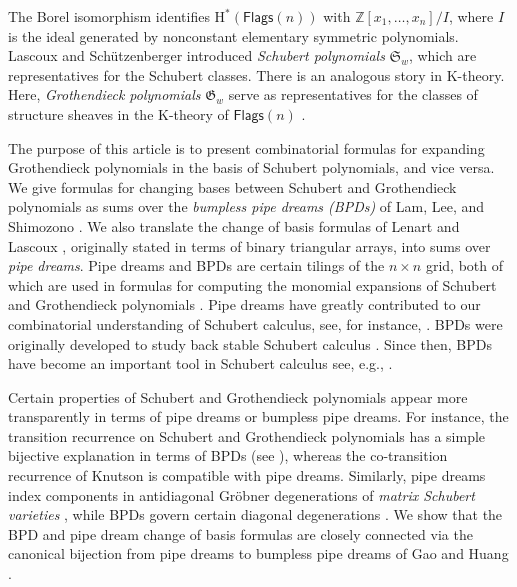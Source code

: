 \documentclass[12 pt]{amsart}
\newcommand{\Flags}{\mathsf{Flags}}
\numberwithin{equation}{section}
\theoremstyle{remark}
\begin{document}
	The Borel isomorphism identifies $\mathrm{H}^*(\Flags(n))$ with $\mathbb{Z}[x_1, \ldots, x_n]/I$, where $I$ is the ideal generated by nonconstant elementary symmetric polynomials. 
	Lascoux and Sch\"utzenberger \cite{Lascoux.Schutzenberger:Schubert} introduced \emph{Schubert polynomials} $\mathfrak{S}_w$, which are representatives for the Schubert classes. 
	There is an analogous story in K-theory. 
	Here, \emph{Grothendieck polynomials} $\mathfrak{G}_w$ serve as representatives for the classes of structure sheaves in the K-theory of $\Flags(n)$ \cite{Lascoux.Schutzenberger}. 
	
	The purpose of this article is to present combinatorial formulas for expanding Grothendieck polynomials in the basis of Schubert polynomials, and vice versa. We give formulas for changing bases between Schubert and Grothendieck polynomials as sums over the \emph{bumpless pipe dreams (BPDs)} of Lam, Lee, and Shimozono \cite{Lam.Lee.Shimozono}. We also translate the change of basis formulas of Lenart \cite{Lenart} and Lascoux \cite{Lascoux.03}, originally stated in terms of binary triangular arrays, into sums over \emph{pipe dreams}.
	Pipe dreams and BPDs are certain tilings of the $n \times n$ grid, both of which are used in formulas for computing the monomial expansions of Schubert and Grothendieck polynomials \cite{BJS93, Bergeron.Billey, Fomin.Stanley, Fomin.Kirillov, Fomin.Kirillov.96, Lam.Lee.Shimozono, Weigandt}. 
	Pipe dreams have greatly contributed to our combinatorial understanding of Schubert calculus, see, for instance, \cite{Knutson.Miller, Kogan.Miller, Assaf.Searles, Knutson:cotransition}.
	BPDs were originally developed to study back stable Schubert calculus \cite{Lam.Lee.Shimozono,Lam.Lee.Shimozono-K-theory}. 
	Since then, BPDs have become an important tool in Schubert calculus see, e.g., \cite{Buciumas.Scrimshaw, Huang.2023, Huang, Huang.Striker, LOTRZ}.
	
	
	Certain properties of Schubert and Grothendieck polynomials appear more transparently in terms of pipe dreams or bumpless pipe dreams. 
	For instance, the transition recurrence on Schubert and Grothendieck polynomials has a simple bijective explanation in terms of BPDs (see \cite{Lascoux, Weigandt}), whereas the co-transition recurrence of Knutson \cite{Knutson:cotransition} is compatible with pipe dreams. 
	Similarly, pipe dreams index components in antidiagonal Gr\"obner degenerations of \emph{matrix Schubert varieties} \cite{Knutson.Miller}, while BPDs govern certain diagonal degenerations \cite{Knutson.Miller.Yong, Hamaker.Pechenik.Weigandt, Klein, Klein.Weigandt}.
	We show that the BPD and pipe dream change of basis formulas are closely connected via the canonical bijection from pipe dreams to bumpless pipe dreams of Gao and Huang \cite{Gao.Huang}. 
	
\end{document}
